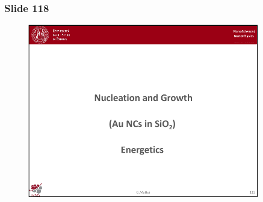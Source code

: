 \documentclass[../main/main.tex]{subfiles}
\begin{document}
\newpage

\subsubsection{Slide 118}

\begin{figure}[h!]
\centering
\includegraphics[page=4,width=0.9\textwidth]{../lessons/pdf_file/8_lesson.pdf}
\end{figure}
\end{document}
